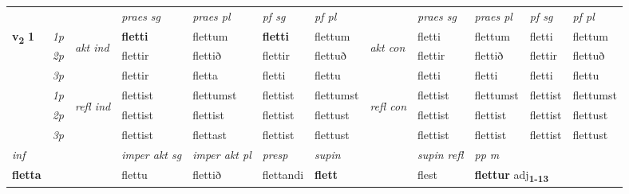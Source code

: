 \begin{longtable}[l]{X>{\footnotesize\itshape}llXXXXlXXXX}
 & &   & \textit{praes sg}  & \textit{praes pl}    & \textit{ pf sg} & \textit{pf pl} & & \textit{praes sg}  & \textit{praes pl}    & \textit{pf sg} & \textit{pf pl }  \\ \cmidrule{4-7} \cmidrule{9-12}
 \multirow{2}{*}{{{\textbf{v{\textsubscript{2}}} \Large{\textbf{1}}}}}  & 1p & \multirow{3}{*}{\begin{turn}{90}\textit{akt ind}\end{turn}} & \textbf{fletti} & flettum & \textbf{fletti} & flettum & \multirow{3}{*}{\begin{turn}{90}\textit{akt con}\end{turn}} &fletti & flettum & fletti & flettum\\*
 & 2p &  &  flettir  & flettið & flettir & flettuð & & flettir & flettið & flettir & flettuð \\*
 & 3p &  & flettir & fletta & fletti & flettu & & fletti & fletti& fletti & flettu \\*
\cmidrule{4-7} \cmidrule{9-12}
 & 1p & \multirow{3}{*}{\begin{turn}{90}\textit{refl ind}\end{turn}}  & flettist & flettumst & flettist & flettumst & \multirow{3}{*}{\begin{turn}{90}\textit{refl con}\end{turn}}  &flettist & flettumst & flettist & flettumst \\*
 & 2p &  & flettist & flettist & flettist & flettust & &flettist & flettist & flettist & flettust \\*
 & 3p  & & flettist & flettast & flettist & flettust & & flettist & flettist& flettist & flettust \\*
\cmidrule{4-7} \cmidrule{9-12}

   {\textit{inf}} & &  & \textit{imper akt sg} & \textit{imper akt pl}   & \textit{presp} & \textit{supin} && \textit{supin refl} & \textit{pp m} \\*
  {\textbf{fletta}} & && flettu  & flettið   & flettandi &  \textbf{flett} && flest & \multicolumn{2}{l}{\textbf{flettur} adj\textbf{\textsubscript{1-13}}} \\*

\midrule


\end{longtable}
